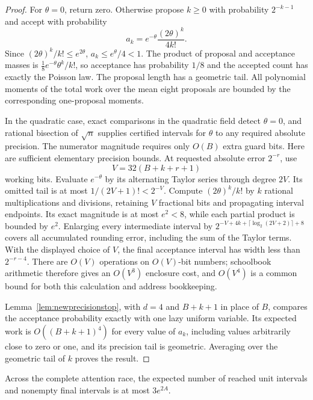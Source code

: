 \begin{proof}
For $\theta=0$, return zero.  Otherwise propose $k\ge0$ with probability
$2^{-k-1}$ and accept with probability
\[
 a_k=e^{-\theta}\frac{(2\theta)^k}{4k!}.
\]
Since $(2\theta)^k/k!\le e^{2\theta}$,
$a_k\le e^\theta/4<1$.  The product of proposal and acceptance masses is
$\frac18e^{-\theta}\theta^k/k!$, so acceptance has probability $1/8$ and
the accepted count has exactly the Poisson law.  The proposal length has a
geometric tail.  All polynomial moments of the total work over the mean
eight proposals are bounded by the corresponding one-proposal moments.

In the quadratic case, exact comparisons in the quadratic field detect
$\theta=0$, and rational bisection of $\sqrt n$ supplies certified
intervals for $\theta$ to any required absolute precision. The
numerator magnitude requires only $O(B)$ extra guard bits.
Here are sufficient elementary precision bounds. At requested absolute
error $2^{-r}$, use
\[
 V=32(B+k+r+1)
\]
working bits.  Evaluate $e^{-\theta}$ by its alternating Taylor series
through degree $2V$.  Its omitted tail is at most $1/(2V+1)!<2^{-V}$.
Compute $(2\theta)^k/k!$ by $k$ rational multiplications and divisions,
retaining $V$ fractional bits and propagating interval endpoints.  Its
exact magnitude is at most $e^2<8$, while each partial product is bounded
by $e^2$.  Enlarging every intermediate interval by
$2^{-V+4k+\lceil\log_2(2V+2)\rceil+8}$ covers all accumulated rounding
error, including the sum of the Taylor terms.  With the displayed choice of $V$, the
final acceptance interval has width less than $2^{-r-4}$.
There are $O(V)$ operations on $O(V)$-bit numbers; schoolbook arithmetic
therefore gives an $O(V^3)$ enclosure cost, and $O(V^4)$ is a common bound
for both this calculation and address bookkeeping.

Lemma~\ref{lem:newprecisionstop}, with $d=4$ and $B+k+1$ in place of
$B$, compares the acceptance probability exactly with one lazy uniform
variable.  Its expected work is $O((B+k+1)^4)$ for every value of $a_k$,
including values arbitrarily close to zero or one, and its precision
tail is geometric.  Averaging over the geometric tail of $k$ proves the
result.
\end{proof}

\begin{lemma}
\label{lem:lazyattentionblocks}
Across the complete attention race, the expected number of reached unit
intervals and nonempty final intervals is at most $3e^{2A}$.
\end{lemma}
